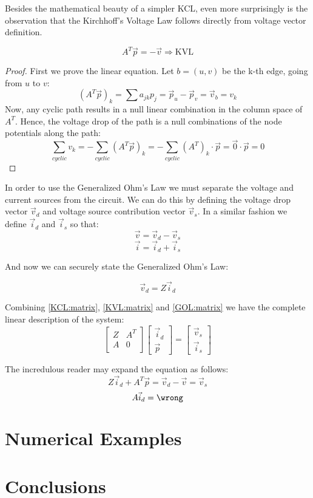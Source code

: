 \documentclass{comjnl}
\begin{document}
Besides the mathematical beauty of a simpler KCL, even more surprisingly is the observation that the Kirchhoff's Voltage Law follows directly from voltage vector definition.

\begin{theorem}[KVL]
\label{KVL:matrix}
$$ A^T\vec{p}=-\vec{v} \Rightarrow \mbox{KVL}  $$
\end{theorem}
\begin{proof}
First we prove the linear equation. Let $b=(u,v)$ be the k-th edge, going from $u$ to $v$:
$$(A^T\vec{p})_k = \sum a_{jk}p_j = \vec{p}_u - \vec{p}_v = \vec{v}_b = v_k$$
Now, any cyclic path results in a null linear combination in the column space of $A^T$. Hence, the voltage drop of the path is a null combinations of the node potentials along the path:
$$ \sum_{cyclic}v_k = - \sum_{cyclic} (A^T\vec{p})_k  = - \sum_{cyclic} (A^T)_k \cdot \vec{p} = \vec{0} \cdot \vec{p} = 0$$
\end{proof}

In order to use the Generalized Ohm's Law we must separate the voltage and current sources from the circuit. We can do this by defining the voltage drop vector $\vec{v}_{d}$ and voltage source contribution vector $\vec{v}_{s}$. In a similar fashion we define $\vec{i}_{d}$ and $\vec{i}_{s}$ so that:
$$ \vec{v} = \vec{v}_{d} - \vec{v}_{s}$$
$$ \vec{i} = \vec{i}_{d} +  \vec{i}_{s}$$

And now we can securely state the Generalized Ohm's Law:
\begin{axiom}[GOL]
\label{GOL:matrix}
$$ \vec{v}_{d} = Z \vec{i}_{d} $$
\end{axiom}

Combining \ref{KCL:matrix}, \ref{KVL:matrix} and \ref{GOL:matrix} we have the complete linear description of the system:
\begin{equation}
\begin{bmatrix}
	Z & A^T \\
	A & 0   \\
\end{bmatrix}
\begin{bmatrix}
	\vec{i}_d \\
	\vec{p}
\end{bmatrix}
=
\begin{bmatrix}
	\vec{v}_s \\
	\vec{i}_s
\end{bmatrix}
\end{equation}

The incredulous reader may expand the equation as follows:
$$ Z\vec{i}_d + A^T\vec{p} = \vec{v}_d - \vec{v} = \vec{v}_s $$
$$ A\vec{i}_d = \wrong $$

\section{Numerical Examples}


\section{Conclusions}
\label{Conclusions}


\nocite{*}



\end{document}
